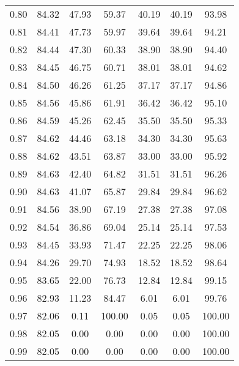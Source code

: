 \begin{tabular}{|c|c|c|c|c|c|c|}
      0.80 &     84.32 &     47.93 &      59.37 &   40.19 &      40.19 &         93.98 \\
      0.81 &     84.41 &     47.73 &      59.97 &   39.64 &      39.64 &         94.21 \\
      0.82 &     84.44 &     47.30 &      60.33 &   38.90 &      38.90 &         94.40 \\
      0.83 &     84.45 &     46.75 &      60.71 &   38.01 &      38.01 &         94.62 \\
      0.84 &     84.50 &     46.26 &      61.25 &   37.17 &      37.17 &         94.86 \\
      0.85 &     84.56 &     45.86 &      61.91 &   36.42 &      36.42 &         95.10 \\
      0.86 &     84.59 &     45.26 &      62.45 &   35.50 &      35.50 &         95.33 \\
      0.87 &     84.62 &     44.46 &      63.18 &   34.30 &      34.30 &         95.63 \\
      0.88 &     84.62 &     43.51 &      63.87 &   33.00 &      33.00 &         95.92 \\
      0.89 &     84.63 &     42.40 &      64.82 &   31.51 &      31.51 &         96.26 \\
      0.90 &     84.63 &     41.07 &      65.87 &   29.84 &      29.84 &         96.62 \\
      0.91 &     84.56 &     38.90 &      67.19 &   27.38 &      27.38 &         97.08 \\
      0.92 &     84.54 &     36.86 &      69.04 &   25.14 &      25.14 &         97.53 \\
      0.93 &     84.45 &     33.93 &      71.47 &   22.25 &      22.25 &         98.06 \\
      0.94 &     84.26 &     29.70 &      74.93 &   18.52 &      18.52 &         98.64 \\
      0.95 &     83.65 &     22.00 &      76.73 &   12.84 &      12.84 &         99.15 \\
      0.96 &     82.93 &     11.23 &      84.47 &    6.01 &       6.01 &         99.76 \\
      0.97 &     82.06 &      0.11 &     100.00 &    0.05 &       0.05 &        100.00 \\
      0.98 &     82.05 &      0.00 &       0.00 &    0.00 &       0.00 &        100.00 \\
      0.99 &     82.05 &      0.00 &       0.00 &    0.00 &       0.00 &        100.00 \\
\bottomrule
\end{tabular}
